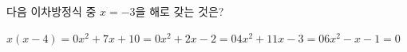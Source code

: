 다음 이차방정식 중 $x=-3$을 해로 갖는 것은?
\begin{choicesii}{$x(x-4)=0$}{$x^2+7x+10=0$}{$x^2+2x-2=0$}{$4x^2+11x-3=0$}{$6x^2-x-1=0$}\end{choicesii}

